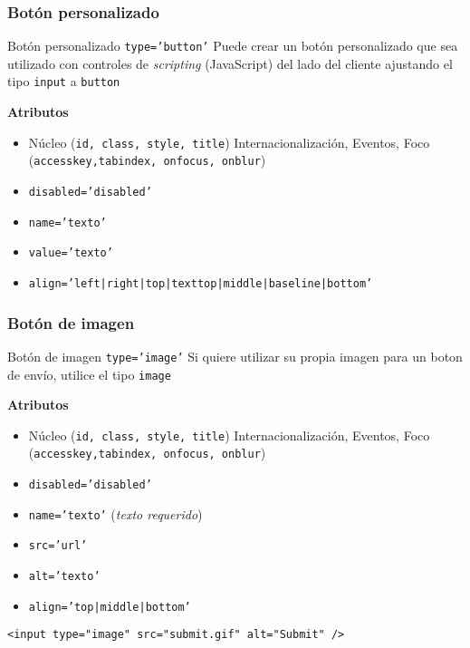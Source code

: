 \documentclass{beamer}
\begin{document}
\subsubsection{Botón personalizado }

\begin{frame}{Botón personalizado \texttt{type='button'}} %
    Puede crear un botón personalizado que sea utilizado con controles de
    \textit{scripting} (JavaScript) del lado del cliente ajustando el tipo
    \texttt{input} a \texttt{button}\\
    \footnotesize{
    \textbf{Atributos}
    \begin{itemize}
        \item Núcleo (\texttt{id, class, style, title}) Internacionalización,
        Eventos, Foco (\texttt{accesskey,tabindex, onfocus, onblur})
        \item \texttt{disabled='disabled'}
        \item \texttt{name='texto'}
        \item \texttt{value='texto'}
        \item \texttt{align='left|right|top|texttop|middle|baseline|bottom'}
    \end{itemize}
    }
\end{frame}

\subsubsection{Botón de imagen}

\begin{frame}[fragile]{Botón de imagen \texttt{type='image'}} %
    Si quiere utilizar su propia imagen para un boton de envío,  utilice el
    tipo \texttt{image}\\

    \footnotesize{
    \textbf{Atributos}
    \begin{itemize}
        \item Núcleo (\texttt{id, class, style, title}) Internacionalización,
        Eventos, Foco (\texttt{accesskey,tabindex, onfocus, onblur})
        \item \texttt{disabled='disabled'}
        \item \texttt{name='texto'} (\textit{texto requerido})
        \item \texttt{src='url'}
        \item \texttt{alt='texto'}
        \item \texttt{align='top|middle|bottom'}
    \end{itemize}
    }
\begin{lstlisting}
<input type="image" src="submit.gif" alt="Submit" />
\end{lstlisting}

\end{frame}
\end{document}
